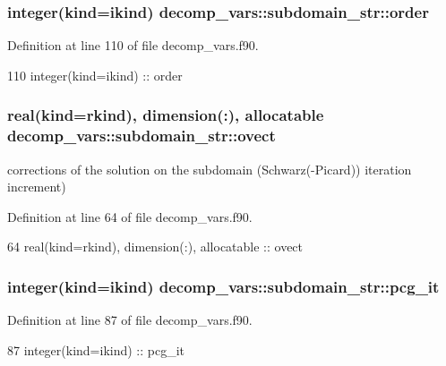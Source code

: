 \subsubsection[{order}]{\setlength{\rightskip}{0pt plus 5cm}integer(kind=ikind) decomp\+\_\+vars\+::subdomain\+\_\+str\+::order}\label{structdecomp__vars_1_1subdomain__str_a5cd68a90868998e4b8761c035d313195}


Definition at line 110 of file decomp\+\_\+vars.\+f90.


\begin{DoxyCode}
110     \textcolor{keywordtype}{integer(kind=ikind)} :: order
\end{DoxyCode}
\subsubsection[{ovect}]{\setlength{\rightskip}{0pt plus 5cm}real(kind=rkind), dimension(\+:), allocatable decomp\+\_\+vars\+::subdomain\+\_\+str\+::ovect}\label{structdecomp__vars_1_1subdomain__str_af84872a226ad2399cb79727cd4a7f737}


corrections of the solution on the subdomain (Schwarz(-\/\+Picard)) iteration increment) 



Definition at line 64 of file decomp\+\_\+vars.\+f90.


\begin{DoxyCode}
64     \textcolor{keywordtype}{real(kind=rkind)}, \textcolor{keywordtype}{dimension(:)}, \textcolor{keywordtype}{allocatable} :: ovect
\end{DoxyCode}
\subsubsection[{pcg\+\_\+it}]{\setlength{\rightskip}{0pt plus 5cm}integer(kind=ikind) decomp\+\_\+vars\+::subdomain\+\_\+str\+::pcg\+\_\+it}\label{structdecomp__vars_1_1subdomain__str_a965cf1846f7ac33e213edc8901e34cca}


Definition at line 87 of file decomp\+\_\+vars.\+f90.


\begin{DoxyCode}
87     \textcolor{keywordtype}{integer(kind=ikind)} :: pcg\_it
\end{DoxyCode}
